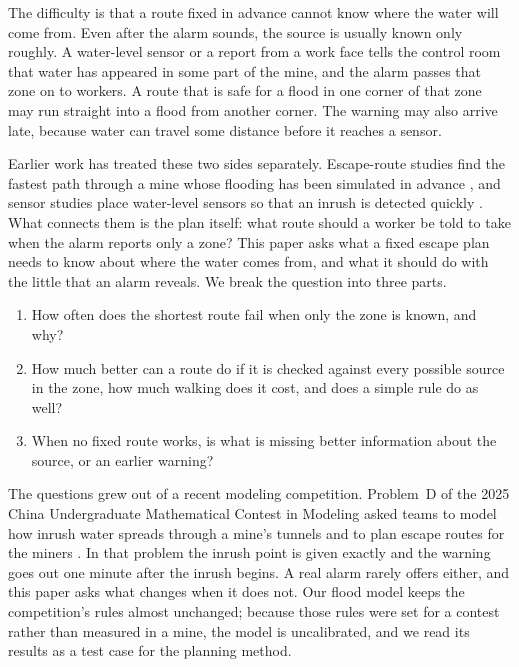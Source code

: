 \documentclass[11pt,a4paper]{article}
\begin{document}
The difficulty is that a route fixed in advance cannot know where the water will come from. Even after the alarm sounds, the source is usually known only roughly. A water-level sensor or a report from a work face tells the control room that water has appeared in some part of the mine, and the alarm passes that zone on to workers. A route that is safe for a flood in one corner of that zone may run straight into a flood from another corner. The warning may also arrive late, because water can travel some distance before it reaches a sensor.

Earlier work has treated these two sides separately. Escape-route studies find the fastest path through a mine whose flooding has been simulated in advance \cite{wu2020}, and sensor studies place water-level sensors so that an inrush is detected quickly \cite{wu2021}. What connects them is the plan itself: what route should a worker be told to take when the alarm reports only a zone? This paper asks what a fixed escape plan needs to know about where the water comes from, and what it should do with the little that an alarm reveals. We break the question into three parts.
\begin{enumerate}
\item How often does the shortest route fail when only the zone is known, and why?
\item How much better can a route do if it is checked against every possible source in the zone, how much walking does it cost, and does a simple rule do as well?
\item When no fixed route works, is what is missing better information about the source, or an earlier warning?
\end{enumerate}

The questions grew out of a recent modeling competition. Problem~D of the 2025 China Undergraduate Mathematical Contest in Modeling asked teams to model how inrush water spreads through a mine's tunnels and to plan escape routes for the miners \cite{cumcm}. In that problem the inrush point is given exactly and the warning goes out one minute after the inrush begins. A real alarm rarely offers either, and this paper asks what changes when it does not. Our flood model keeps the competition's rules almost unchanged; because those rules were set for a contest rather than measured in a mine, the model is uncalibrated, and we read its results as a test case for the planning method.
\end{document}
